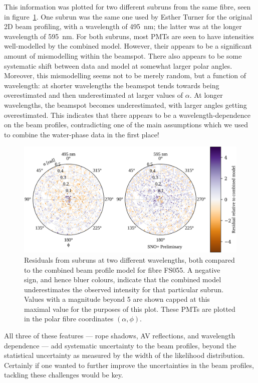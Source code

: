 This information was plotted for two different subruns from the same fibre, seen in figure~\ref{fig:llr}. One subrun was the same one used by Esther Turner for the original 2D beam profiling, with a wavelength of \SI{495}{\nano\metre}; the latter was at the longer wavelength of \SI{595}{\nano\metre}. For both subruns, most PMTs are seen to have intensities well-modelled by the combined model. However, their appears to be a significant amount of mismodelling within the beamspot. There also appears to be some systematic shift between data and model at somewhat larger polar angles. Moreover, this mismodelling seems not to be merely random, but a function of wavelength: at shorter wavelengths the beamspot tends towards being overestimated and then underestimated at larger values of $\alpha$. At longer wavelengths, the beamspot becomes underestimated, with larger angles getting overestimated. This indicates that there appears to be a wavelength-dependence on the beam profiles, contradicting one of the main assumptions which we used to combine the water-phase data in the first place!
\begin{figure}
    \centering
    \includegraphics[width=\textwidth]{4_SMELLIESimulation/images/residual_wavelength_comparison_data_model_nice.pdf}
    \caption[Residuals from subruns at two different wavelengths, both compared to the combined beam profile model for fibre FS055]{Residuals from subruns at two different wavelengths, both compared to the combined beam profile model for fibre FS055. A negative sign, and hence bluer colours, indicate that the combined model underestimates the observed intensity for that particular subrun. Values with a magnitude beyond 5 are shown capped at this maximal value for the purposes of this plot. These PMTs are plotted in the polar fibre coordinates $(\alpha,\phi)$.}
    \label{fig:llr}
\end{figure}
All three of these features --- rope shadows, AV reflections, and wavelength dependence --- add systematic uncertainty to the beam profiles, beyond the statistical uncertainty as measured by the width of the likelihood distribution. Certainly if one wanted to further improve the uncertainties in the beam profiles, tackling these challenges would be key.

